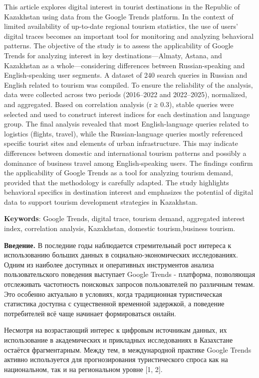 This article explores digital interest in tourist destinations in the
Republic of Kazakhstan using data from the Google Trends platform. In
the context of limited availability of up-to-date regional tourism
statistics, the use of users' digital traces becomes an important tool
for monitoring and analyzing behavioral patterns. The objective of the
study is to assess the applicability of Google Trends for analyzing
interest in key destinations---Almaty, Astana, and Kazakhstan as a
whole---considering differences between Russian-speaking and
English-speaking user segments. A dataset of 240 search queries in
Russian and English related to tourism was compiled. To ensure the
reliability of the analysis, data were collected across two periods
(2016--2022 and 2022--2025), normalized, and aggregated. Based on
correlation analysis (r ≥ 0.3), stable queries were selected and used to
construct interest indices for each destination and language group. The
final analysis revealed that most English-language queries related to
logistics (flights, travel), while the Russian-language queries mostly
referenced specific tourist sites and elements of urban infrastructure.
This may indicate differences between domestic and international tourism
patterns and possibly a dominance of business travel among
English-speaking users. The findings confirm the applicability of Google
Trends as a tool for analyzing tourism demand, provided that the
methodology is carefully adapted. The study highlights behavioral
specifics in destination interest and emphasizes the potential of
digital data to support tourism development strategies in Kazakhstan.

{\bfseries Keywords}: Google Trends, digital trace, tourism demand,
aggregated interest index, correlation analysis, Kazakhstan, domestic
tourism,business tourism.

{\bfseries Введение.} В последние годы наблюдается стремительный рост
интереса к использованию больших данных в социально-экономических
исследованиях. Одним из наиболее доступных и оперативных инструментов
анализа пользовательского поведения выступает Google Trends - платформа,
позволяющая отслеживать частотность поисковых запросов пользователей по
различным темам. Это особенно актуально в условиях, когда традиционная
туристическая статистика доступна с существенной временной задержкой, а
поведение потребителей всё чаще начинает формироваться онлайн.

Несмотря на возрастающий интерес к цифровым источникам данных, их
использование в академических и прикладных исследованиях в Казахстане
остаётся фрагментарным. Между тем, в международной практике Google
Trends активно используется для прогнозирования туристического спроса
как на национальном, так и на региональном уровне {[}1, 2{]}.

